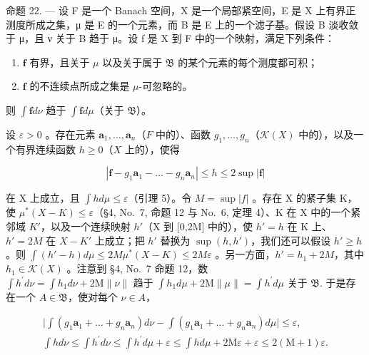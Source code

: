 命题 22. --- 设 F 是一个 Banach 空间，X 是一个局部紧空间，E 是 X 上有界正测度所成之集，μ 是 E 的一个元素，而 B 是 E 上的一个滤子基。假设 B 淡收敛于 μ，且 \textbar\textbar ν\textbar\textbar{} 关于 B 趋于 \textbar\textbar μ\textbar\textbar{}。设 f 是 X 到 F 中的一个映射，满足下列条件：

\begin{enumerate}
\def\labelenumi{(\roman{enumi})}
\item
  \(\mathbf{f}\) 有界，且关于 \(\mu\) 以及关于属于 \(\mathfrak{B}\) 的某个元素的每个测度都可积；
\item
  \(\mathbf{f}\) 的不连续点所成之集是 \(\mu\)-可忽略的。
\end{enumerate}

则 \(\int \mathbf{f}d\nu\) 趋于 \(\int \mathbf{f}d\mu\)（关于 \(\mathfrak{B}\)）。

设 \(\varepsilon > 0\) 。存在元素 \(\mathbf{a}_1, \ldots, \mathbf{a}_n\)（\(F\) 中的）、函数 \(g_1, \ldots, g_n\)（\(\mathcal{K}(X)\) 中的），以及一个有界连续函数 \(h \geqslant 0\)（\(X\) 上的），使得

\[
\left| \mathbf {f} - g _ {1} \mathbf {a} _ {1} - \dots - g _ {n} \mathbf {a} _ {n} \right| \leqslant h \leqslant 2 \sup | \mathbf {f} |
\]

在 X 上成立，且 \(\int h d\mu \leqslant \varepsilon\)（引理 5）。令 \(M = \sup |f|\) 。存在 X 的紧子集 K，使 \(\mu^{*}(X - K) \leqslant \varepsilon\)（§4, No.~7, 命题 12 与 No.~6, 定理 4）、K 在 X 中的一个紧邻域 \(K'\)，以及一个连续映射 \(h'\)（X 到 {[}0,2M{]} 中的），使 \(h' = h\) 在 K 上、\(h' = 2M\) 在 \(X - K'\) 上成立；把 \(h'\) 替换为 \(\sup(h, h')\)，我们还可以假设 \(h' \geqslant h\) 。则 \(\int(h' - h) d\mu \leqslant 2M\mu^{*}(X - K) \leqslant 2M\varepsilon\) 。另一方面，\(h' = h_1 + 2M\)，其中 \(h_1 \in \mathcal{K}(X)\) 。注意到 §4, No.~7 命题 12，数 \(\int h^{\prime}d\nu = \int h_{1}d\nu +2\mathrm{M}\| \nu \| \text{ 趋于 } \int h_{1}d\mu +2\mathrm{M}\| \mu \| = \int h^{\prime}d\mu \text{ 关于 } \mathfrak{B}.\) 于是存在一个 \(A\in \mathfrak{B}\)，使对每个 \(\nu \in A\)，

\[
\begin{array}{c} \Big | \int (g _ {1} \mathbf {a} _ {1} + \dots + g _ {n} \mathbf {a} _ {n}) d \nu - \int (g _ {1} \mathbf {a} _ {1} + \dots + g _ {n} \mathbf {a} _ {n}) d \mu \Big | \leqslant \varepsilon , \\ \int h d \nu \leqslant \int h ^ {\prime} d \nu \leqslant \int h ^ {\prime} d \mu + \varepsilon \leqslant \int h d \mu + 2 \mathrm{M} \varepsilon + \varepsilon \leqslant 2 (\mathrm{M} + 1) \varepsilon . \end{array}
\]

